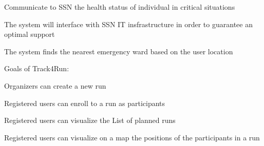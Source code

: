 \begin{goalList}
\begin{enumerate}[label={[}G 2.\arabic*{]}]
\item \label{goal:sos1}Communicate to SSN the health status of individual in critical situations
\item \label{goal:sos2}
The system will interface with SSN IT insfrastructure in order to guarantee an optimal support
\item \label{goal:sos3}The system finds the nearest emergency ward based on the user location

\end{enumerate}

Goals of Track4Run:
\begin{enumerate}[label={[}G 3.\arabic*{]}]

\item \label{goal:run1}
Organizers can create a new run
\item \label{goal:run2}Registered users can enroll to a run as participants
\item \label{goal:run3}Registered users can visualize the List of planned runs
\item \label{goal:run4}Registered users can visualize on a map the positions of the participants
in a run


\end{enumerate}
\end{goalList}

